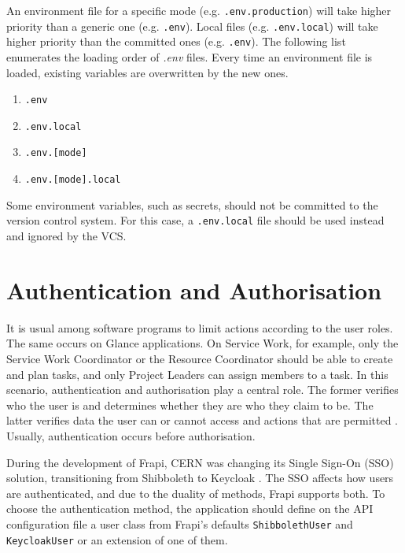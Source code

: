 An environment file for a specific mode (e.g. \texttt{.env.production}) will take higher priority than a generic one (e.g. \texttt{.env}). Local files (e.g. \texttt{.env.local}) will take higher priority than the committed ones (e.g. \texttt{.env}). The following list enumerates the loading order of \textit{.env} files. Every time an environment file is loaded, existing variables are overwritten by the new ones.

\begin{enumerate}
    \item \texttt{.env}
    \item \texttt{.env.local}
    \item \texttt{.env.[mode]}
    \item \texttt{.env.[mode].local}
\end{enumerate}

Some environment variables, such as secrets, should not be committed to the version control system. For this case, a \texttt{.env.local} file should be used instead and ignored by the VCS.

\section{Authentication and Authorisation}
\label{sec:frapi-v1-auth}

It is usual among software programs to limit actions according to the user roles. The same occurs on Glance applications. On Service Work, for example, only the Service Work Coordinator or the Resource Coordinator should be able to create and plan tasks, and only Project Leaders can assign members to a task. In this scenario, authentication and authorisation play a central role. The former verifies who the user is and determines whether they are who they claim to be. The latter verifies data the user can or cannot access and actions that are permitted \cite{auth0-authentication-authorization}. Usually, authentication occurs before authorisation.

During the development of Frapi, CERN was changing its Single Sign-On (SSO) solution, transitioning from Shibboleth \cite{shibboleth-website} to Keycloak \cite{keycloak-website}. The SSO affects how users are authenticated, and due to the duality of methods, Frapi supports both. To choose the authentication method, the application should define on the API configuration file a user class from Frapi's defaults \texttt{ShibbolethUser} and \texttt{KeycloakUser} or an extension of one of them.


